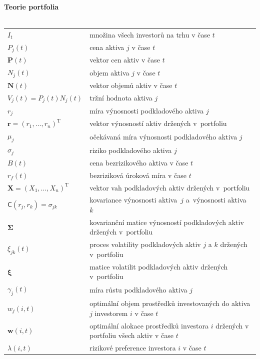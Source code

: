 \documentclass[a4paper,12pt]{report}
\theoremstyle{definition} \newtheorem{definice}[veta]{Definice}
\theoremstyle{remark}
\begin{document}
%
%
\newpage \noindent
\textbf{Teorie portfolia}\\\\
   \begin{tabular}{p{4cm} p{9.3cm}}
   $I_t$ 								& množina všech investorů na trhu v čase $t$\\
   $P_j(t)$                             &   cena aktiva $j$ v čase $t$ \\
   $\boldsymbol{P}(t)$                             &   vektor cen aktiv v čase $t$\\
   $N_j(t)$                             &   objem aktiva $j$ v čase $t$ \\
   $\boldsymbol{N}(t)$     &   vektor objemů aktiv v čase $t$\\
   $V_j(t)=P_j(t)N_j(t)$       &  tržní hodnota aktiva $j$\\
   $r_j$  								& míra výnosnosti podkladového aktiva $j$\\
   $\boldsymbol{r}=(r_1,\dots,r_n)^\mathrm{T}$  		& vektor výnosností aktiv držených v~portfoliu\\
   $\mu_j$ 								& očekávaná míra výnosnosti podkladového aktiva $j$\\
   $\sigma_j$								& riziko podkladového aktiva $j$\\
   $B(t)$ 								& cena bezrizikového aktiva v čase $t$\\
   $r_f(t)$ 								& bezriziková úroková míra v čase $t$\\
   $\boldsymbol{X}=(X_1,\dots,X_n)^\mathrm{T}$		& vektor vah podkladových aktiv držených v~portfoliu\\
   $\mathsf{C}(r_j,r_k)=\sigma_{jk}$				& kovariance výnosnosti aktiva~$j$ a~výnosnosti aktiva~$k$\\
   $\boldsymbol{\Sigma}$						& kovarianční matice výnosností podkladových aktiv držených v~portfoliu\\
   $\xi_{jk}(t)$ 							& proces volatility podkladových aktiv $j$ a $k$ držených v~portfoliu\\
   $\boldsymbol{\xi}$						& matice volatilit podkladových aktiv držených v~portfoliu\\
   $\gamma_j(t)$ 							& míra růstu  podkladového aktiva $j$\\
   $w_{j}(i,t)$ 							& optimální objem prostředků investovaných do aktiva $j$ investorem $i$ v čase $t$\\
   $\boldsymbol{w}(i,t)$					 	& optimální alokace prostředků investora $i$ držených v portfoliu všech aktiv v čase $t$\\
   $\lambda(i,t)$							& rizikové preference investora $i$ v čase $t$ \\  
\end{tabular}\\\\\\
\end{document}
